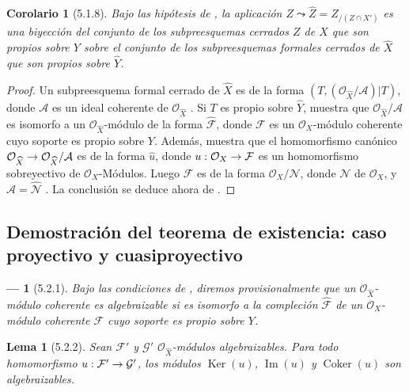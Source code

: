 \documentclass[10pt,oneside,openany]{book}
\theoremstyle{egaenv}\newtheorem*{env}{---}
\theoremstyle{egastatement}
\newtheorem*{lemma}{Lema}
\newtheorem*{corollary}{Corolario}
\theoremstyle{egadescription}
\renewcommand{\to}{\mathchoice{\longrightarrow}{\rightarrow}{\rightarrow}{\rightarrow}}
\begin{document}
\begin{corollary}[5.1.8]
\label{III.5.1.8}
\label{III.5.1.8-fr}
Bajo las hipótesis de , la aplicación
$Z\leadsto\widehat Z=Z_{/(Z\cap X')}$
es una biyección del conjunto de los subpreesquemas cerrados $Z$ de $X$
que son propios sobre $Y$ sobre el conjunto de los subpreesquemas
formales cerrados de $\widehat X$ que son propios sobre
$\widehat Y$.
\end{corollary}

\begin{proof}
Un subpreesquema formal cerrado de $\widehat X$ es de la forma
$(T,(\mathcal O_{\widehat X}/\mathcal A)|T)$,
donde $\mathcal A$ es un ideal coherente de
$\mathcal O_{\widehat X}$ . Si $T$ es propio sobre
$\widehat Y$,  muestra que
$\mathcal O_{\widehat X}/\mathcal A$ es isomorfo a un
$\mathcal O_{\widehat X}$-módulo de la forma
$\widehat{\mathcal F}$, donde $\mathcal F$ es un
$\mathcal O_X$-módulo coherente cuyo soporte es propio sobre $Y$. Además,
 muestra que el homomorfismo canónico
$\mathcal O_{\widehat X}\to\mathcal O_{\widehat X}/\mathcal A$
es de la forma $\widehat u$, donde
$u:\mathcal O_X\to\mathcal F$ es un homomorfismo sobreyectivo de
$\mathcal O_X$-Módulos. Luego $\mathcal F$ es de la forma
$\mathcal O_X/\mathcal N$, donde $\mathcal N$ de
$\mathcal O_X$, y
$\mathcal A=\widehat{\mathcal N}$ . La conclusión se
deduce ahora de .
\end{proof}


\subsection{Demostración del teorema de existencia: caso proyectivo y cuasiproyectivo}
\label{subsection:III.5.2}
\label{subsection:III.5.2-fr}

\begin{env}[5.2.1]
\label{III.5.2.1}
\label{III.5.2.1-fr}
Bajo las condiciones de , diremos
provisionalmente que un $\mathcal O_{\widehat X}$-módulo coherente es
\emph{algebraizable} si es isomorfo a la compleción
$\widehat{\mathcal F}$ de un $\mathcal O_X$-módulo coherente $\mathcal F$ cuyo
soporte es propio sobre $Y$.
\end{env}

\begin{lemma}[5.2.2]
\label{III.5.2.2}
\label{III.5.2.2-fr}
Sean $\mathcal F'$ y $\mathcal G'$ $\mathcal O_{\widehat X}$-módulos
algebraizables. Para todo homomorfismo
$u:\mathcal F'\to\mathcal G'$, los módulos
$\operatorname{Ker}(u)$, $\operatorname{Im}(u)$ y $\operatorname{Coker}(u)$ son
algebraizables.
\end{lemma}
\end{document}
